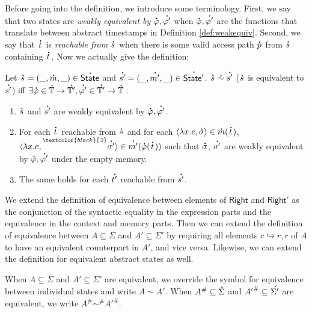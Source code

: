 \documentclass[acmsmall,screen,review]{acmart}\settopmatter{printfolios=true,printccs=false,printacmref=false}
\theoremstyle{acmdefinition}
\newcommand*{\prexists}[2][black]{\prescript{\textcolor{#1}{\exists}}{}{#2}}
\newcommand*{\A}[1]{\overset{\,_{\mbox{\Large .}}}{#1}}
\newcommand*{\Abs}[1]{{#1}^{\#}}
\newcommand*{\Time}{\mathbb{T}}
\newcommand*{\ATime}{\A{\Time}}
\newcommand*{\ctx}{\sigma}
\newcommand*{\mem}{m}
\newcommand*{\config}{c}
\newcommand*{\Right}{\mathsf{Right}}
\newcommand*{\rightst}{r}
\newcommand*{\State}{\mathsf{State}}
\newcommand*{\AState}{\A{\mathsf{State}}}
\newcommand*{\semarrow}{\hookrightarrow}
\newcommand*{\equivalent}{\sim}
\begin{document}
Before going into the definition, we introduce some terminology.
First, we say that two states are \emph{weakly equivalent by} $\A\varphi,\A{\varphi'}$ when $\A\varphi,\A{\varphi'}$ are the functions that translate between abstract timestamps in Definition \ref{def:weakequiv}.
Second, we say that $\A{t}$ is \emph{reachable from} $\A{s}$ when there is some valid access path $\A{p}$ from $\A{s}$ containing $\A{t}$.
Now we actually give the definition:
\begin{definition}[Equivalent Abstract States: $\A\equivalent$]
  Let $\A{s}=(\_,\A\mem,\_)\in\AState$ and $\A{s'}=(\_,\A{\mem'},\_)\in\A{\State'}$.
  $\A{s}\A\equivalent\A{s'}$ ($\A{s}$ is equivalent to $\A{s'}$) iff $\exists\A\varphi\in\ATime\rightarrow\A{\Time'},\A{\varphi'}\in\A{\Time'}\rightarrow\ATime:$
  \begin{enumerate}
    \item $\A{s}$ and $\A{s'}$ are weakly equivalent by $\A\varphi,\A{\varphi'}$.
    \item For each $\A{t}$ reachable from $\A{s}$ and for each $\langle\lambda x.e,\A{\ctx}\rangle\in\A\mem(\A{t})$, $\langle\lambda x.e,\prexists{\A{\ctx'}}\rangle\in\A{\mem'}(\A\varphi(\A{t}))$ such that $\A{\ctx}$, $\A{\ctx'}$ are weakly equivalent by $\A\varphi,\A{\varphi'}$ under the empty memory.
    \item The same holds for each $\A{t'}$ reachable from $\A{s'}$.
  \end{enumerate}
\end{definition}

We extend the definition of equivalence between elements of $\Right$ and $\Right'$ as the conjunction of the syntactic equality in the expression parts and the equivalence in the context and memory parts.
Then we can extend the definition of equivalence between $A\subseteq\Sigma$ and $A'\subseteq\Sigma'$ by requiring all elements $\config\semarrow\rightst,\rightst$ of $A$ to have an equivalent counterpart in $A'$, and vice versa.
Likewise, we can extend the definition for equivalent abstract states as well.

When $A\subseteq\Sigma$ and $A'\subseteq\Sigma'$ are equivalent, we override the symbol for equivalence between individual states and write $A\equivalent A'$.
When $\Abs{A}\subseteq\A{\Sigma}$ and $\Abs{A'}\subseteq\A{\Sigma'}$ are equivalent, we write $\Abs{A}\Abs\equivalent\Abs{A'}$.
\end{document}
